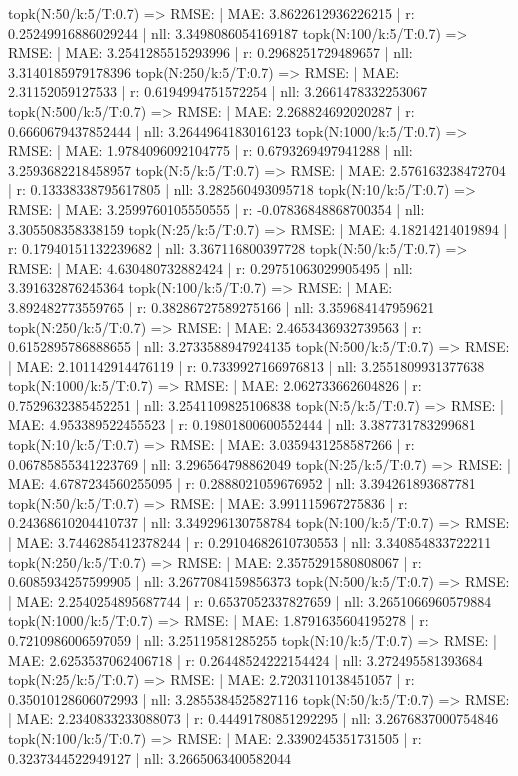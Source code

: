 topk(N:50/k:5/T:0.7) => RMSE: | MAE: 3.8622612936226215 | r: 0.25249916886029244 | nll: 3.3498086054169187
topk(N:100/k:5/T:0.7) => RMSE: | MAE: 3.2541285515293996 | r: 0.2968251729489657 | nll: 3.3140185979178396
topk(N:250/k:5/T:0.7) => RMSE: | MAE: 2.31152059127533 | r: 0.6194994751572254 | nll: 3.2661478332253067
topk(N:500/k:5/T:0.7) => RMSE: | MAE: 2.268824692020287 | r: 0.6660679437852444 | nll: 3.2644964183016123
topk(N:1000/k:5/T:0.7) => RMSE: | MAE: 1.9784096092104775 | r: 0.6793269497941288 | nll: 3.2593682218458957
topk(N:5/k:5/T:0.7) => RMSE: | MAE: 2.576163238472704 | r: 0.13338338795617805 | nll: 3.282560493095718
topk(N:10/k:5/T:0.7) => RMSE: | MAE: 3.2599760105550555 | r: -0.07836848868700354 | nll: 3.305508358338159
topk(N:25/k:5/T:0.7) => RMSE: | MAE: 4.18214214019894 | r: 0.17940151132239682 | nll: 3.367116800397728
topk(N:50/k:5/T:0.7) => RMSE: | MAE: 4.630480732882424 | r: 0.29751063029905495 | nll: 3.391632876245364
topk(N:100/k:5/T:0.7) => RMSE: | MAE: 3.892482773559765 | r: 0.38286727589275166 | nll: 3.359684147959621
topk(N:250/k:5/T:0.7) => RMSE: | MAE: 2.4653436932739563 | r: 0.6152895786888655 | nll: 3.2733588947924135
topk(N:500/k:5/T:0.7) => RMSE: | MAE: 2.101142914476119 | r: 0.7339927166976813 | nll: 3.2551809931377638
topk(N:1000/k:5/T:0.7) => RMSE: | MAE: 2.062733662604826 | r: 0.7529632385452251 | nll: 3.2541109825106838
topk(N:5/k:5/T:0.7) => RMSE: | MAE: 4.953389522455523 | r: 0.19801800600552444 | nll: 3.387731783299681
topk(N:10/k:5/T:0.7) => RMSE: | MAE: 3.0359431258587266 | r: 0.06785855341223769 | nll: 3.296564798862049
topk(N:25/k:5/T:0.7) => RMSE: | MAE: 4.6787234560255095 | r: 0.2888021059676952 | nll: 3.394261893687781
topk(N:50/k:5/T:0.7) => RMSE: | MAE: 3.991115967275836 | r: 0.24368610204410737 | nll: 3.349296130758784
topk(N:100/k:5/T:0.7) => RMSE: | MAE: 3.7446285412378244 | r: 0.29104682610730553 | nll: 3.340854833722211
topk(N:250/k:5/T:0.7) => RMSE: | MAE: 2.3575291580808067 | r: 0.6085934257599905 | nll: 3.2677084159856373
topk(N:500/k:5/T:0.7) => RMSE: | MAE: 2.2540254895687744 | r: 0.6537052337827659 | nll: 3.2651066960579884
topk(N:1000/k:5/T:0.7) => RMSE: | MAE: 1.8791635604195278 | r: 0.7210986006597059 | nll: 3.25119581285255
topk(N:10/k:5/T:0.7) => RMSE: | MAE: 2.6253537062406718 | r: 0.26448524222154424 | nll: 3.272495581393684
topk(N:25/k:5/T:0.7) => RMSE: | MAE: 2.7203110138451057 | r: 0.35010128606072993 | nll: 3.2855384525827116
topk(N:50/k:5/T:0.7) => RMSE: | MAE: 2.2340833233088073 | r: 0.44491780851292295 | nll: 3.2676837000754846
topk(N:100/k:5/T:0.7) => RMSE: | MAE: 2.3390245351731505 | r: 0.3237344522949127 | nll: 3.2665063400582044

